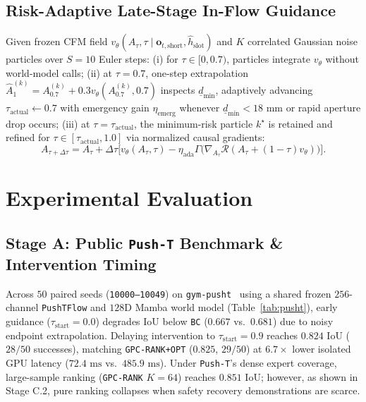 \documentclass[letterpaper, 10pt, conference]{ieeeconf}
\begin{document}
\subsection{Risk-Adaptive Late-Stage In-Flow Guidance}
Given frozen CFM field $v_\theta(A_\tau, \tau \mid \mathbf{o}_{t,\text{short}}, \hat{h}_{\text{slot}})$ and $K$ correlated Gaussian noise particles over $S=10$ Euler steps: (i) for $\tau \in [0, 0.7)$, particles integrate $v_\theta$ without world-model calls; (ii) at $\tau = 0.7$, one-step extrapolation $\hat{A}_1^{(k)} = A_{0.7}^{(k)} + 0.3 v_\theta(A_{0.7}^{(k)}, 0.7)$ inspects $\underline{d}_{\min}$, adaptively advancing $\tau_{\text{actual}} \leftarrow 0.7$ with emergency gain $\eta_{\text{emerg}}$ whenever $\underline{d}_{\min} < 18\text{ mm}$ or rapid aperture drop occurs; (iii) at $\tau = \tau_{\text{actual}}$, the minimum-risk particle $k^\star$ is retained and refined for $\tau \in [\tau_{\text{actual}}, 1.0]$ via normalized causal gradients:
\begin{equation}
    A_{\tau+\Delta\tau} = A_\tau + \Delta\tau\Big[v_\theta(A_\tau,\tau) - \eta_{\text{ada}}\Gamma\!\big(\nabla_{A_\tau}\mathcal{R}(A_\tau + (1-\tau)v_\theta)\big)\Big].
\end{equation}

\section{Experimental Evaluation}

\subsection{Stage A: Public \texttt{Push-T} Benchmark \& Intervention Timing}
Across $50$ paired seeds (\texttt{10000--10049}) on \texttt{gym-pusht}~\cite{chi2024diffusion} using a shared frozen $256$-channel \texttt{PushTFlow} and $128\text{D}$ Mamba world model (Table~\ref{tab:pusht}), early guidance ($\tau_{\text{start}}=0.0$) degrades IoU below \texttt{BC} ($0.667$ vs.\ $0.681$) due to noisy endpoint extrapolation. Delaying intervention to $\tau_{\text{start}}=0.9$ reaches $0.824$ IoU ($28/50$ successes), matching \texttt{GPC-RANK+OPT} ($0.825$, $29/50$) at $6.7\times$ lower isolated GPU latency ($72.4\text{ ms}$ vs.\ $485.9\text{ ms}$). Under \texttt{Push-T}'s dense expert coverage, large-sample ranking (\texttt{GPC-RANK} $K=64$) reaches $0.851$ IoU; however, as shown in Stage C.2, pure ranking collapses when safety recovery demonstrations are scarce.
\end{document}
